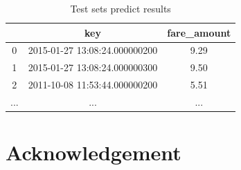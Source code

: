 \begin{table}[htbp]  
\centering
  \begin{center}
  \begin{tabular}{ccc}
\toprule
    & key & fare\_amount \\
\midrule
    0 & 2015-01-27 13:08:24.000000200 & 9.29 \\
    1 & 2015-01-27 13:08:24.000000300 & 9.50 \\
    2 & 2011-10-08 11:53:44.000000200 & 5.51 \\
    ... & ... &... \\
\bottomrule
\end{tabular}
\end{center}
\caption{Test sets predict results}
\end{table}









\newpage
\section*{Acknowledgement}





